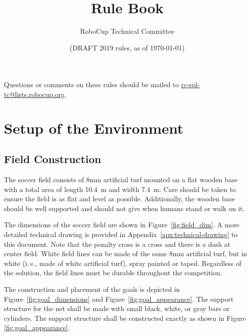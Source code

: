 \documentclass[12pt]{article}
\title{\leaguename Rule Book}
\author{RoboCup Technical Committee}
\date{(DRAFT 2019 rules, as of \today)}
\newcommand{\ie}{\mbox{i.\,e.}\xspace}
\newcommand{\TotalWidth}{7.4~m\xspace}
\newcommand{\TotalLength}{10.4~m\xspace }
\begin{document}
\maketitle

\begin{center}
Questions or comments on these rules should be mailed to \url{rc-spl-tc@lists.robocup.org}.
\end{center}

\vfill

\tableofcontents
\setcounter{tocdepth}{3}

\thispagestyle{fancy}

\clearpage

\cfoot{\thepage}
\setcounter{page}{1}

\newpage

\section{Setup of the Environment}

\subsection{Field Construction}
\label{sec:field_dim}

The soccer field consists of 8mm artificial turf mounted on a flat wooden base with a total area of length \TotalLength and width \TotalWidth.  Care should be taken to ensure the field is as flat and level as possible.  Additionally, the wooden base should be well supported and should not give when humans stand or walk on it.

The dimensions of the soccer field are shown in Figure~\ref{fig:field_dim}. 
A more detailed technical drawing is provided in Appendix~\ref{apx:technical-drawing} to this document.
Note that the penalty cross is a cross and there is a dash at center field. White field lines can be made of the same 8mm artificial turf, but in white (\ie, made of white artificial turf), spray painted or taped. Regardless of the solution, the field lines must be durable throughout the competition.

The construction and placement of the goals is depicted in Figure~\ref{fig:goal_dimensions} and Figure~\ref{fig:goal_appearance}. The support structure for the net shall be made with small black, white, or gray bars or cylinders.  The support structure shall be constructed exactly as shown in Figure \ref{fig:goal_appearance}.
\end{document}
